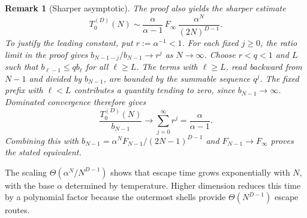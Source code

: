 \documentclass[conference]{IEEEtran}
\DeclareRobustCommand{\revfiveadd}[1]{{\color{revisionpurple}#1}}
\newtheorem{remark}{Remark}
\begin{document}
\begin{remark}[Sharper asymptotic]
\label{rmk:sharp}
The proof also yields the sharper estimate
\begin{equation}
\label{eq:sharp-asymptotic}
T_0^{(D)}(N) \sim \frac{\alpha}{\alpha-1}\,F_\infty\,
\frac{\alpha^N}{(2N)^{D-1}}.
\end{equation}
To justify the leading constant, put $r:=\alpha^{-1}<1$.
For each fixed $j\ge0$, the ratio limit in the proof gives
$b_{N-1-j}/b_{N-1}\to r^j$ as $N\to\infty$.
Choose $r<q<1$ and $L$ such that $b_{\ell-1}\le q b_\ell$
for all $\ell\ge L$.
The terms with $\ell\ge L$, read backward from $N-1$ and
divided by $b_{N-1}$, are bounded by the summable sequence $q^j$.
The fixed prefix with $\ell<L$ contributes a quantity tending
to zero, since $b_{N-1}\to\infty$.
Dominated convergence therefore gives
\[
\frac{T_0^{(D)}(N)}{b_{N-1}}
\longrightarrow \sum_{j=0}^{\infty}r^j
=\frac{\alpha}{\alpha-1}.
\]
Combining this with
$b_{N-1}=\alpha^N F_{N-1}/(2N-1)^{D-1}$ and
$F_{N-1}\to F_\infty$ proves the stated equivalent.

\end{remark}



The scaling $\Theta(\alpha^N/N^{D-1})$ shows that escape time
grows exponentially with $N$, with the base $\alpha$ determined
by temperature. Higher dimension reduces this time by a
polynomial factor because the outermost shells provide
$\Theta(N^{D-1})$ escape routes.


\end{document}
